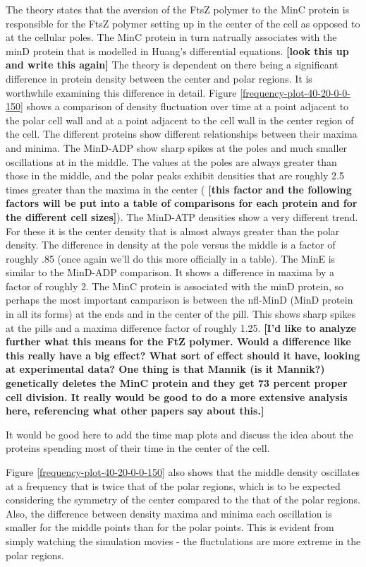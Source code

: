 \documentclass[letterpaper,twocolumn,amsmath,amssymb,pre]{revtex4-1}
\newcommand{\red}[1]{{\bf \color{red} #1}}
\newcommand{\fixme}[1]{\red{[#1]}}
\begin{document}
The theory states that the aversion of the FtsZ polymer to the MinC
protein is responsible for the FtsZ polymer setting up in the center
of the cell as opposed to at the cellular poles.  The MinC protein in
turn natrually associates with the minD protein that is modelled in
Huang's differential equations.  \fixme{look this up and write this
  again} The theory is dependent on there being a significant
difference in protein density between the center and polar regions. It
is worthwhile examining this difference in detail.  Figure
\ref{frequency-plot-40-20-0-0-150} shows a comparison of density
fluctuation over time at a point adjacent to the polar cell wall and
at a point adjacent to the cell wall in the center region of the cell.
The different proteins show different relationships between their
maxima and minima.  The MinD-ADP show sharp spikes at the poles and
much smaller oscillations at in the middle.  The values at the poles
are always greater than those in the middle, and the polar peaks
exhibit densities that are roughly 2.5 times greater than the maxima
in the center (\fixme{this factor and the following factors will be put
  into a table of comparisons for each protein and for the different
  cell sizes}).  The MinD-ATP densities show a very different trend.
For these it is the center density that is almost always greater than
the polar density.  The difference in density at the pole versus the
middle is a factor of roughly .85 (once again we'll do this more
officially in a table).  The MinE is similar to the MinD-ADP
comparison.  It shows a difference in maxima by a factor of roughly 2.
The MinC protein is associated with the minD protein, so perhaps the
most important camparison is between the nfl-MinD (MinD protein in all
its forms) at the ends and in the center of the pill.  This shows
sharp spikes at the pills and a maxima difference factor of roughly
1.25. \fixme{I'd like to analyze further what this means for the FtZ
  polymer.  Would a difference like this really have a big effect?
  What sort of effect should it have, looking at experimental data?
  One thing is that Mannik (is it Mannik?) genetically deletes the
  MinC protein and they get 73 percent proper cell division.  It
  really would be good to do a more extensive analysis here,
  referencing what other papers say about this.}

It would be good here to add the time map plots and discuss the idea
about the proteins spending most of their time in the center of the
cell.

Figure \ref{frequency-plot-40-20-0-0-150} also shows that the middle
density oscillates at a frequency that is twice that of the polar
regions, which is to be expected considering the symmetry of the
center compared to the that of the polar regions.  Also, the
difference between density maxima and minima each oscillation is
smaller for the middle points than for the polar points.  This is
evident from simply watching the simulation movies - the fluctulations
are more extreme in the polar regions.
\end{document}
